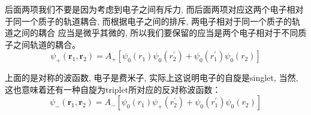 \documentclass[a4paper,zihao=-4,linespread=1]{ctexrep}
\begin{document}
    后面两项我们不要是因为考虑到电子之间有斥力, 而后面两项对应这两个电子相对于同一个质子的轨道耦合, 而根据电子之间的排斥, 两电子相对于同一个质子的轨道之间的耦合
    应当是微乎其微的, 所以我们要保留的应当是两个电子相对于不同质子之间轨道的耦合。
    \[\psi_{+}\left(\mathbf{r}_{1}, \mathbf{r}_{2}\right)=A_{+}\left[\psi_{0}\left(r_{1}\right) \psi_{0}\left(r_{2}^{\prime}\right)+\psi_{0}\left(r_{1}^{\prime}\right) \psi_{0}\left(r_{2}\right)\right]\]
    
    上面的是对称的波函数, 电子是费米子, 实际上这说明电子的自旋是singlet, 当然, 这也意味着还有一种自旋为triplet所对应的反对称波函数：
    \[\psi_{-}\left(\mathbf{r}_{1}, \mathbf{r}_{2}\right)=A_{-}\left[\psi_{0}\left(r_{1}\right) \psi_{+}\left(r_{2}^{\prime}\right)+\psi_{0}\left(r_{1}^{\prime}\right) \psi_{0}\left(r_{2}\right)\right]\]
    
\end{document}
